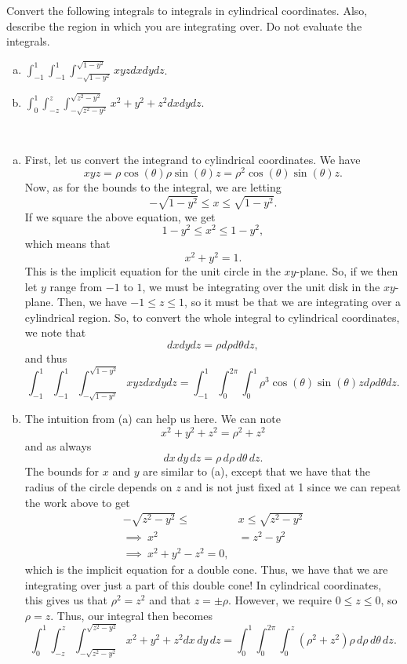\documentclass[12pt]{article} %
\begin{document}
\newpage
\begin{problem}
    Convert the following integrals to integrals in cylindrical coordinates. Also, describe the region in which you are integrating over. Do not evaluate the integrals.
    \begin{enumerate}[(a)]
        \item $\displaystyle{\int_{-1}^{1} \int_{-1}^{1} \int_{-\sqrt{1-y^2}}^{\sqrt{1-y^2}} xyz dxdydz}$.
        \item $\displaystyle{\int_0^1 \int_{-z}^z \int_{-\sqrt{z^2-y^2}}^{\sqrt{z^2-y^2}} x^2+y^2+z^2 dxdydz}$.
    \end{enumerate}
\end{problem}
\begin{solution}~
\begin{enumerate}[(a)]
    \item First, let us convert the integrand to cylindrical coordinates. We have
    \[
    xyz = \rho \cos (\theta) \rho \sin(\theta) z = \rho^2 \cos(\theta)\sin(\theta)z.
    \]
    Now, as for the bounds to the integral, we are letting
    \[
    -\sqrt{1-y^2}\leq x \leq \sqrt{1-y^2}.
    \]
    If we square the above equation, we get
    \[
    1-y^2 \leq x^2 \leq 1-y^2,
    \]
    which means that
    \[
    x^2+y^2 =1.
    \]
    This is the implicit equation for the unit circle in the $xy$-plane.  So, if we then let $y$ range from $-1$ to $1$, we must be integrating over the unit disk in the $xy$-plane.  Then, we have $-1\leq z\leq 1$, so it must be that we are integrating over a cylindrical region.  So, to convert the whole integral to cylindrical coordinates, we note that
    \[
    dxdydz = \rho d\rho d\theta dz,
    \]
    and thus
    \[
    \int_{-1}^{1} \int_{-1}^{1} \int_{-\sqrt{1-y^2}}^{\sqrt{1-y^2}} xyz dxdydz = \int_{-1}^1 \int_{0}^{2\pi} \int_{0}^1 \rho^3 \cos(\theta)\sin(\theta)z d\rho d\theta dz.
    \]
    \item The intuition from (a) can help us here. We can note
    \[
    x^2+y^2+z^2 = \rho^2+z^2
    \]
    and as always
    \[
    dx\,dy\,dz = \rho \, d\rho \, d\theta \, dz.
    \]
    The bounds for $x$ and $y$ are similar to (a), except that we have that the radius of the circle depends on $z$ and is not just fixed at 1 since we can repeat the work above to get
    \begin{align*}
        -\sqrt{z^2-y^2}\leq &x \leq \sqrt{z^2-y^2} \\
        \implies ~ x^2&= z^2-y^2 \\
        \implies ~ x^2+y^2-z^2=0,
    \end{align*}
    which is the implicit equation for a double cone. Thus, we have that we are integrating over just a part of this double cone! In cylindrical coordinates, this gives us that $\rho^2=z^2$ and that $z=\pm\rho$. However, we require $0\leq z \leq 0$, so $\rho=z$.  Thus, our integral then becomes
    \[
    \int_0^1 \int_{-z}^z \int_{-\sqrt{z^2-y^2}}^{\sqrt{z^2-y^2}} x^2+y^2+z^2 dx\,dy\,dz = \int_{0}^1 \int_0^{2\pi} \int_{0}^z \left(\rho^2 + z^2 \right) \rho \, d\rho \, d \theta\, dz. 
    \]
    
    \end{enumerate}
\end{solution}
\end{document}
